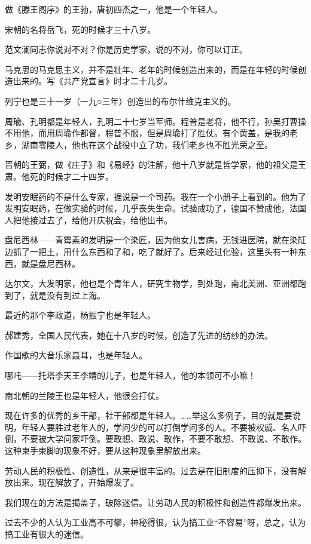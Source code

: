 做《滕王阁序》的王勃，唐初四杰之一，他是一个年轻人。

宋朝的名将岳飞，死的时候才三十八岁。

范文澜同志你说对不对？你是历史学家，说的不对，你可以订正。

马克思的马克思主义，并不是壮年、老年的时候创造出来的，而是在年轻的时候创造出来的。写《共产党宣言》时才二十几岁。

列宁也是三十一岁（一九○三年）创造出的布尔什维克主义的。

周瑜、孔明都是年轻人，孔明二十七岁当军师。程普是老将，他不行，孙吴打曹操不用他，而用周瑜作都督，程普不服，但是周瑜打了胜仗。有个黄盖，是我的老乡，湖南零陵人，他也在这个战役中立了功，我们老乡也不胜光荣之至。

晋朝的王弼，做《庄子》和《易经》的注解，他十八岁就是哲学家，他的祖父是王肃。他死的时候才二十四岁。

发明安眠药的不是什么专家，据说是一个司药。我在一个小册子上看到的。他为了发明安眠药，在做实验的时候，几乎丧失生命。试验成功了，德国不赞成他，法国人把他接过去了，给他开庆祝会，给他出书。

盘尼西林——青霉素的发明是一个染匠，因为他女儿害病，无钱进医院，就在染缸边抓了一把土，用什么东西和了和，吃了就好了。后来经过化验，这里头有一种东西，就是盘尼西林。

达尔文，大发明家，他也是个青年人，研究生物学，到处跑，南北美洲、亚洲都跑到了，就是没有到过上海。

最近的那个李政道，杨振宁也是年轻人。

郝建秀，全国人民代表，她在十八岁的时候，创造了先进的纺纱的办法。

作国歌的大音乐家聂耳，也是年轻人。

哪吒——托塔李天王李靖的儿子，也是年轻人，他的本领可不小嘛！

南北朝的兰陵王也是年轻人，他很会打仗。

现在许多的优秀的乡干部，社干部都是年轻人。……举这么多例子，目的就是要说明，年轻人要胜过老年人的，学问少的可以打倒学问多的人。不要被权威、名人吓倒，不要被大学问家吓倒。要敢想、敢说、敢作，不要不敢想、不敢说、不敢作。这种束手束脚的现象不好，要从这种现象里解放出来。

劳动人民的积极性、创造性，从来是很丰富的。过去是在旧制度的压抑下，没有解放出来。现在解放了，开始爆发了。

我们现在的方法是揭盖子，破除迷信。让劳动人民的积极性和创造性都爆发出来。

过去不少的人认为工业高不可攀，神秘得很，认为搞工业“不容易”呀，总之，认为搞工业有很大的迷信。

